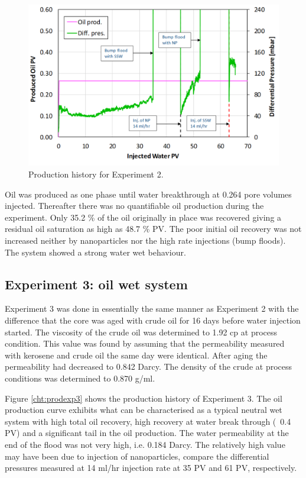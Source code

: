 \begin{figure}[h!]
    \centering
    \includegraphics[width=\textwidth]{img/cht/prodexp2.png}
    \caption{Production history for Experiment 2.}
    \label{cht:prodexp2} %
\end{figure}

Oil was produced as one phase until water breakthrough at 0.264 pore volumes injected. Thereafter there was no quantifiable oil production during the experiment. Only 35.2 \% of the oil originally in place was recovered giving a residual oil saturation as high as 
48.7 \% PV. The poor initial oil recovery was not increased neither by nanoparticles nor the high rate injections (bump floods). The system showed a strong water wet behaviour.

\subsection{Experiment 3: oil wet system}

Experiment 3 was done in essentially the same manner as Experiment 2 with the difference that the core was aged with crude oil for 16 days before water injection started. The viscosity of the crude oil was determined to 1.92 cp at process condition. This value was found by assuming that the permeability measured with kerosene and crude oil the same day were identical. After aging the permeability had decreased to 0.842 Darcy. The density of the crude at process conditions was determined to 0.870 g/ml.

Figure \ref{cht:prodexp3} shows the production history of Experiment 3. The oil production curve exhibits what can be characterised as a typical neutral wet system with high total oil recovery, high recovery at water break through (~0.4 PV) and a significant tail in the oil production. The water permeability at the end of the flood was not very high, i.e. 0.184 Darcy. The relatively high value may have been due to injection of nanoparticles, compare the differential pressures measured at 14 ml/hr injection rate at 35 PV and 61 PV, respectively.


